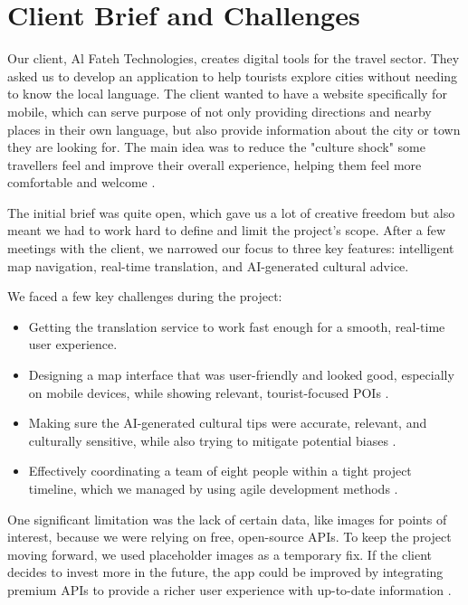 \section{Client Brief and Challenges}

Our client, Al Fateh Technologies, creates digital tools for the travel sector. They asked us to develop an application to help tourists explore cities without needing to know the local language. The client wanted to have a website specifically for mobile, which can serve purpose of not only providing directions and nearby places in their own language, but also provide information about the city or town they are looking for. The main idea was to reduce the "culture shock" some travellers feel and improve their overall experience, helping them feel more comfortable and welcome \cite{culturegap}.

The initial brief was quite open, which gave us a lot of creative freedom but also meant we had to work hard to define and limit the project's scope. After a few meetings with the client, we narrowed our focus to three key features: intelligent map navigation, real-time translation, and AI-generated cultural advice.

We faced a few key challenges during the project:
\begin{itemize}
\item Getting the translation service to work fast enough for a smooth, real-time user experience.
\item Designing a map interface that was user-friendly and looked good, especially on mobile devices, while showing relevant, tourist-focused POIs \cite{uxTourism}.
\item Making sure the AI-generated cultural tips were accurate, relevant, and culturally sensitive, while also trying to mitigate potential biases \cite{aiBias}.
\item Effectively coordinating a team of eight people within a tight project timeline, which we managed by using agile development methods \cite{agileTeams}.
\end{itemize}

One significant limitation was the lack of certain data, like images for points of interest, because we were relying on free, open-source APIs. To keep the project moving forward, we used placeholder images as a temporary fix. If the client decides to invest more in the future, the app could be improved by integrating premium APIs to provide a richer user experience with up-to-date information \cite{crowdsourcing}.

